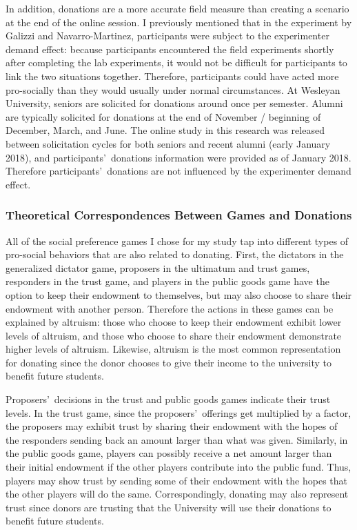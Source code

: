 \documentclass[12pt]{article}
\begin{document}
In addition, donations are a more accurate field measure than creating a scenario at the end of the online session. I previously mentioned that in the experiment by Galizzi and Navarro-Martinez, participants were subject to the experimenter demand effect: because participants encountered the field experiments shortly after completing the lab experiments, it would not be difficult for participants to link the two situations together. Therefore, participants could have acted more pro-socially than they would usually under normal circumstances. At Wesleyan University, seniors are solicited for donations around once per semester. Alumni are typically solicited for donations at the end of November / beginning of December, March, and June. The online study in this research was released between solicitation cycles for both seniors and recent alumni (early January 2018), and participants\rq \ donations information were provided as of January 2018. Therefore participants\rq \ donations are not influenced by the experimenter demand effect.


\subsubsection{Theoretical Correspondences Between Games and Donations}

All of the social preference games I chose for my study tap into different types of pro-social behaviors that are also related to donating. First, the dictators in the generalized dictator game, proposers in the ultimatum and trust games, responders in the trust game, and players in the public goods game have the option to keep their endowment to themselves, but may also choose to share their endowment with another person. Therefore the actions in these games can be explained by altruism: those who choose to keep their endowment exhibit lower levels of altruism, and those who choose to share their endowment demonstrate higher levels of altruism. Likewise, altruism is the most common representation for donating since the donor chooses to give their income to the university to benefit future students. 

Proposers\rq \ decisions in the trust and public goods games indicate their trust levels. In the trust game, since the proposers\rq \ offerings get multiplied by a factor, the proposers may exhibit trust by sharing their endowment with the hopes of the responders sending back an amount larger than what was given. Similarly, in the public goods game, players can possibly receive a net amount larger than their initial endowment if the other players contribute into the public fund. Thus, players may show trust by sending some of their endowment with the hopes that the other players will do the same. Correspondingly, donating may also represent trust since donors are trusting that the University will use their donations to benefit future students.
\end{document}
